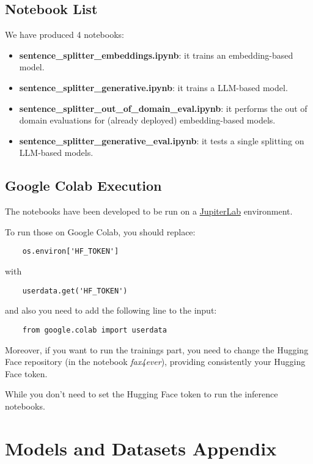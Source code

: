 \documentclass[11pt]{article}
\begin{document}
\subsection{Notebook  List}

We have produced 4 notebooks:

 \begin{itemize}
	\item \textbf{sentence\_splitter\_embeddings.ipynb}: it trains an embedding-based
	model.
	\item \textbf{sentence\_splitter\_generative.ipynb}: it trains a LLM-based model.
	\item \textbf{sentence\_splitter\_out\_of\_domain\_eval.ipynb}: it performs the out of domain 
	evaluations for (already deployed) embedding-based models.
	\item \textbf{sentence\_splitter\_generative\_eval.ipynb}: it tests a single splitting on
	LLM-based models.
\end{itemize}

\subsection{Google Colab Execution}

The notebooks have been developed to be run on a \href{https://jupyterlab.readthedocs.io/en/latest/#}{JupiterLab}
environment. 

To run those on  Google Colab, you should replace:

\begin{verbatim}
	os.environ['HF_TOKEN']
\end{verbatim}

with

\begin{verbatim}
	userdata.get('HF_TOKEN')
\end{verbatim}

and also you need to add the following line to the input:

\begin{verbatim}
	from google.colab import userdata
\end{verbatim}

Moreover, if you want to run the trainings part, you need to change 
the Hugging Face repository (in the notebook \emph{fax4ever}),
providing consistently your Hugging Face token.

While you don't need to set the Hugging Face token to
run the inference notebooks.

\section{Models and Datasets Appendix}
\label{sec:appendix3}
\end{document}
